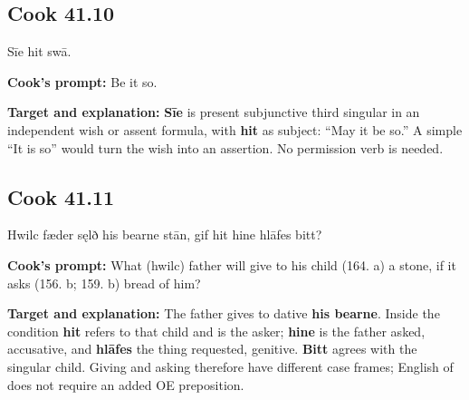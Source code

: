 \par\begin{minipage}{\linewidth}\raggedright
\subsection*{Cook 41.10}

Sīe hit swā.

\textbf{Cook's prompt:} Be it so.

\textbf{Target and explanation:} \textbf{Sīe} is present subjunctive third singular in an independent wish or assent formula, with \textbf{hit} as subject: “May it be so.” A simple “It is so” would turn the wish into an assertion. No permission verb is needed.

\end{minipage}\par\addvspace{4pt}

\par\begin{minipage}{\linewidth}\raggedright
\subsection*{Cook 41.11}

Hwilc fæder sęlð his bearne stān, gif hit hine hlāfes bitt?

\textbf{Cook's prompt:} What (hwilc) father will give to his child (164. a) a stone, if it asks (156. b; 159. b) bread of him?

\textbf{Target and explanation:} The father gives to dative \textbf{his bearne}. Inside the condition \textbf{hit} refers to that child and is the asker; \textbf{hine} is the father asked, accusative, and \textbf{hlāfes} the thing requested, genitive. \textbf{Bitt} agrees with the singular child. Giving and asking therefore have different case frames; English of does not require an added OE preposition.

\end{minipage}\par\addvspace{4pt}

